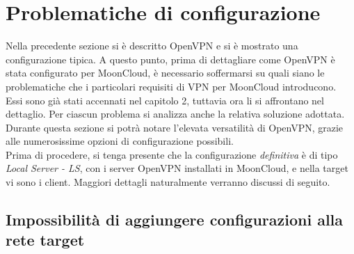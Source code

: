\section{Problematiche di configurazione}
Nella precedente sezione si è descritto OpenVPN e si è mostrato una configurazione
tipica. A questo punto, prima di dettagliare come OpenVPN è stata configurato
per MoonCloud, è necessario soffermarsi su quali siano le problematiche che i particolari
requisiti di VPN per MoonCloud introducono. Essi sono già stati accennati
nel capitolo 2, tuttavia ora li si affrontano nel dettaglio. Per
ciascun problema si analizza anche la relativa soluzione adottata. Durante
questa sezione si potrà notare l'elevata versatilità di OpenVPN, grazie alle numerosissime
opzioni di configurazione possibili.\\
Prima di procedere, si tenga presente che la configurazione \textit{definitiva}
è di tipo \textit{Local Server - LS}, con i server OpenVPN installati
in MoonCloud, e nella target vi sono i client. Maggiori dettagli naturalmente verranno
discussi di seguito.

\subsection{Impossibilità di aggiungere configurazioni alla rete target}\label{subsec:client-nat}
